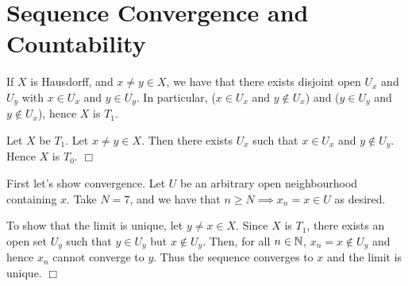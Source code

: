 \documentclass{article}
\begin{document}
\section{Sequence Convergence and Countability}
 {
    If $X$ is Hausdorff, and $x\neq y\in X$, we have that there exists disjoint open $U_{x}$ and $U_{y}$ with $x\in U_{x}$ and $y\in U_{y}$. In particular, ($x\in U_{x}$ and $y\not\in U_{x}$) and ($y\in U_{y}$ and $y\not\in U_{x}$), hence $X$ is $T_{1}$.

    Let $X$ be $T_{1}$. Let $x\neq y \in X$. Then there exists $U_{x}$ such that $x\in U_{x}$ and $y\not\in U_{y}$. Hence $X$ is $T_{0}$. $\Box$
}
 {
    First let's show convergence. Let $U$ be an arbitrary open neighbourhood containing $x$. Take $N = 7$, and we have that $n\geq N \implies x_{n} = x\in U$ as desired.

    To show that the limit is unique, let $y\neq x\in X$. Since $X$ is $T_{1}$, there exists an open set $U_{y}$ such that $y\in U_{y}$ but $x\not\in U_{y}$. Then, for all $n\in\mathbb{N}$, $x_{n} = x\not\in U_{y}$ and hence $x_{n}$ cannot converge to $y$. Thus the sequence converges to $x$ and the limit is unique. $\Box$
}
\end{document}
